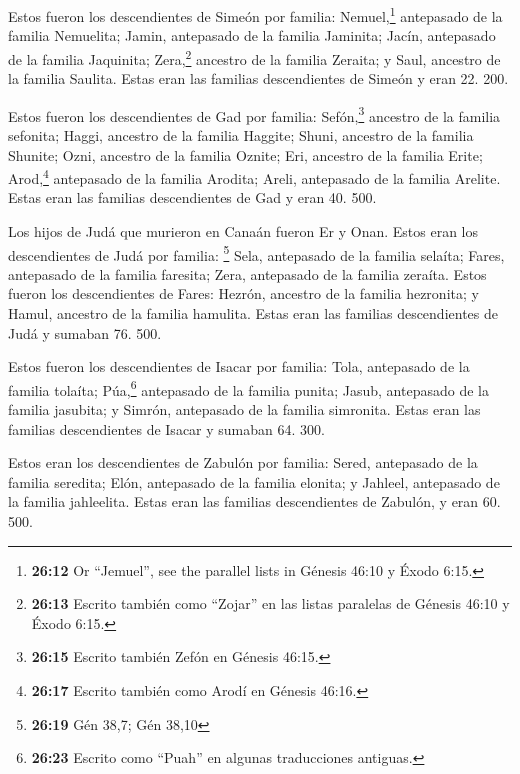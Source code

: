  Estos fueron los descendientes de Simeón por familia:
Nemuel,\footnote{\textbf{26:12} Or ``Jemuel'', see the parallel lists in
  Génesis 46:10 y Éxodo 6:15.} antepasado de la familia Nemuelita;
Jamin, antepasado de la familia Jaminita; Jacín, antepasado de la
familia Jaquinita;  Zera,\footnote{\textbf{26:13} Escrito
  también como ``Zojar'' en las listas paralelas de Génesis 46:10 y
  Éxodo 6:15.} ancestro de la familia Zeraita; y Saul, ancestro de la
familia Saulita.  Estas eran las familias descendientes
de Simeón y eran 22. 200.

 Estos fueron los descendientes de Gad por familia:
Sefón,\footnote{\textbf{26:15} Escrito también Zefón en Génesis 46:15.}
ancestro de la familia sefonita; Haggi, ancestro de la familia Haggite;
Shuni, ancestro de la familia Shunite;  Ozni, ancestro de
la familia Oznite; Eri, ancestro de la familia Erite; 
Arod,\footnote{\textbf{26:17} Escrito también como Arodí en Génesis
  46:16.} antepasado de la familia Arodita; Areli, antepasado de la
familia Arelite.  Estas eran las familias descendientes
de Gad y eran 40. 500.

 Los hijos de Judá que murieron en Canaán fueron Er y
Onan. Estos eran los descendientes de Judá por familia: \footnote{\textbf{26:19}
  Gén 38,7; Gén 38,10}  Sela, antepasado de la familia
selaíta; Fares, antepasado de la familia faresita; Zera, antepasado de
la familia zeraíta.  Estos fueron los descendientes de
Fares: Hezrón, ancestro de la familia hezronita; y Hamul, ancestro de la
familia hamulita.  Estas eran las familias descendientes
de Judá y sumaban 76. 500.

 Estos fueron los descendientes de Isacar por familia:
Tola, antepasado de la familia tolaíta; Púa,\footnote{\textbf{26:23}
  Escrito como ``Puah'' en algunas traducciones antiguas.} antepasado de
la familia punita;  Jasub, antepasado de la familia
jasubita; y Simrón, antepasado de la familia simronita. 
Estas eran las familias descendientes de Isacar y sumaban 64. 300.

 Estos eran los descendientes de Zabulón por familia:
Sered, antepasado de la familia seredita; Elón, antepasado de la familia
elonita; y Jahleel, antepasado de la familia jahleelita. 
Estas eran las familias descendientes de Zabulón, y eran 60. 500.

